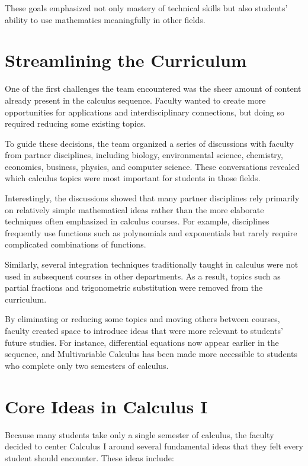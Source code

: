 \documentclass[11pt]{article}
\begin{document}
These goals emphasized not only mastery of technical skills but also students’ ability to use mathematics meaningfully in other fields.

\section*{Streamlining the Curriculum}

One of the first challenges the team encountered was the sheer amount of content already present in the calculus sequence. Faculty wanted to create more opportunities for applications and interdisciplinary connections, but doing so required reducing some existing topics.

To guide these decisions, the team organized a series of discussions with faculty from partner disciplines, including biology, environmental science, chemistry, economics, business, physics, and computer science. These conversations revealed which calculus topics were most important for students in those fields.

Interestingly, the discussions showed that many partner disciplines rely primarily on relatively simple mathematical ideas rather than the more elaborate techniques often emphasized in calculus courses. For example, disciplines frequently use functions such as polynomials and exponentials but rarely require complicated combinations of functions.

Similarly, several integration techniques traditionally taught in calculus were not used in subsequent courses in other departments. As a result, topics such as partial fractions and trigonometric substitution were removed from the curriculum.

By eliminating or reducing some topics and moving others between courses, faculty created space to introduce ideas that were more relevant to students’ future studies. For instance, differential equations now appear earlier in the sequence, and Multivariable Calculus has been made more accessible to students who complete only two semesters of calculus.

\section*{Core Ideas in Calculus I}

Because many students take only a single semester of calculus, the faculty decided to center Calculus I around several fundamental ideas that they felt every student should encounter. These ideas include:
\end{document}
